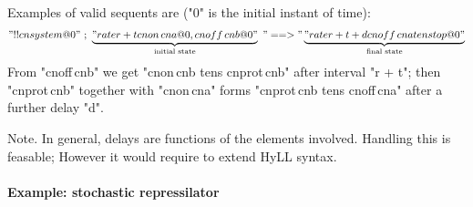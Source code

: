\documentclass{article}
\begin{document}
\noindent
Examples of valid sequents are ("0" is the initial instant of time):
\begin{gather*}
  "!! cn{system} @ 0"
  \ ; \ 
  \underbrace{"rate{r + t}cn{on}\,{cn a} @ 0, cn{off}\,{cn b} @ 0"}_{\text{initial state}}
  \ "==>" 
  \underbrace{"rate{r + t + d}cn{off}\,{cn a} tens top @ 0"}_{\text{final state}}
\end{gather*}
From "cn{off}\,cn{b}" we get "cn{on}\,cn{b} tens cn{prot}\,cn{b}" after interval "r + t"; then
"cn{prot}\,cn{b}" together with "cn{on}\,cn{a}" forms "cn{prot}\,cn{b} tens cn{off}\,cn{a}" after a
further delay "d".

Note. In general, delays are functions of the elements involved. Handling this is feasable; However it would require to extend HyLL syntax.

\paragraph{Example: stochastic repressilator}
\end{document}
